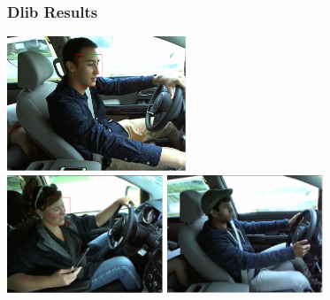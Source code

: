 \documentclass{beamer}
\begin{document}
	\begin{frame}
		\frametitle{Dlib Results}
		\begin{center}
			\includegraphics[width=0.4\textwidth]{faces/dlibface1} \\ \vspace{0.1cm}
			\includegraphics[width=0.35\textwidth]{faces/dlibface2} \hspace{0.1cm}
			\includegraphics[width=0.35\textwidth]{faces/dlibface3}
		\end{center}		
	\end{frame}
	
\end{document}
